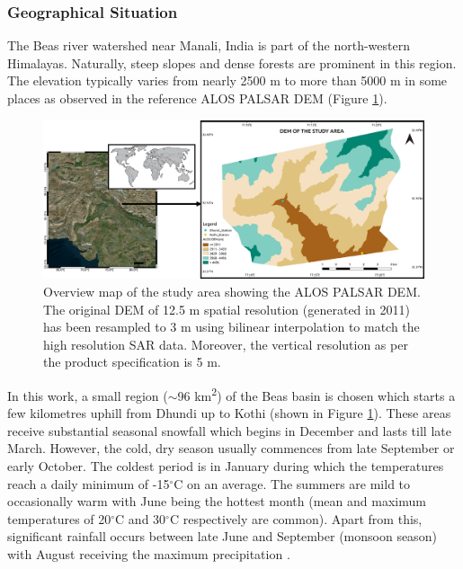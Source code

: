 \documentclass[review]{elsarticle}
\numberwithin{equation}{section}
\numberwithin{figure}{section}
\numberwithin{table}{section}
\begin{document}
\subsubsection{Geographical Situation}
\label{sssec:geo}
The Beas river watershed near Manali, India is part of the north-western Himalayas. Naturally, steep slopes and dense forests are prominent in this region. The elevation typically varies from nearly 2500 m to more than 5000 m in some places as observed in the reference ALOS PALSAR DEM (Figure \ref{fig:overview}). 

\begin{figure}[htb]
    \centering
    \includegraphics[width=\textwidth]{Figures/Overview.png}
    \caption{Overview map of the study area showing the ALOS PALSAR DEM. The original DEM of 12.5 m spatial resolution (generated in 2011) has been resampled to 3 m using bilinear interpolation \citep{Wu2008} to match the high resolution SAR data. Moreover, the vertical resolution as per the product specification is 5 m.}
    \label{fig:overview}
\end{figure}

In this work, a small region ($\sim$96 km\textsuperscript{2}) of the Beas basin is chosen which starts a few kilometres uphill from Dhundi up to Kothi (shown in Figure \ref{fig:overview}). These areas receive substantial seasonal snowfall which begins in December and lasts till late March. However, the cold, dry season usually commences from late September or early October. The coldest period is in January during which the temperatures reach a daily minimum of -15$^\circ$C on an average. The summers are mild to occasionally warm with June being the hottest month (mean and maximum temperatures of 20$^\circ$C and 30$^\circ$C respectively are common). Apart from this, significant rainfall occurs between late June and September (monsoon season) with August receiving the maximum precipitation \citep{Majumdar2019, Thakur2012}.
\end{document}
